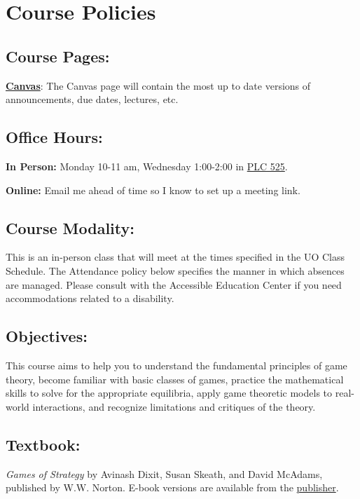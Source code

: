\section{Course Policies}
\subsection*{Course Pages:}

 \href{https://canvas.uoregon.edu/courses/233504}{\textbf{Canvas}}:
  The Canvas page will contain the most up to date versions of announcements, due dates, lectures, etc. 

\subsection*{Office Hours:} 

  \textbf{In Person:} Monday 10-11 am, Wednesday 1:00-2:00
  in \href{https://map.uoregon.edu/4f4d713e0}{PLC 525}.
  
  \textbf{Online:} Email me ahead of time so I know to set up a meeting link.

\subsection*{Course Modality:}

This is an in-person class that will meet at the times specified in the UO Class Schedule.
The Attendance policy below specifies the manner in which absences are managed.
Please consult with the Accessible Education Center if you need accommodations related to a disability.

\subsection*{Objectives:}

This course aims to help you to understand the fundamental principles of game theory, become familiar with basic classes of games, practice the mathematical skills to solve for the appropriate equilibria, apply game theoretic models to real-world interactions, and recognize limitations and critiques of the theory.

\subsection*{Textbook:}

  \textit{Games of Strategy} by Avinash Dixit, Susan Skeath, and David McAdams, published by W.W. Norton.
  E-book versions are available from the \href{https://wwnorton.com/books/Games-of-Strategy}{publisher}.
  

